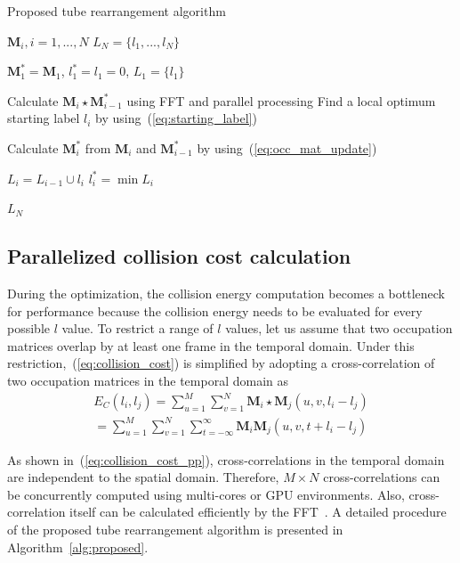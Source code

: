 \documentclass[11pt]{hyu_thesis}
\begin{document}
\begin{algorithm}[t]
\caption{Proposed tube rearrangement algorithm}
\label{alg:proposed}

\begin{algorithmic}
\REQUIRE $\textbf{M}_{i}, i = 1,...,N$
\ENSURE $L_{N} = \{ l_{1},...,l_{N} \}$

\STATE $\textbf{M}_{1}^{*} = \textbf{M}_{1}$, $l_{1}^{*} = l_{1} = 0$, $L_{1} = \{ l_{1} \}$

	\STATE Calculate $\textbf{M}_{i} \star \textbf{M}_{i-1}^{*}$ using FFT and parallel processing
	\STATE Find a local optimum starting label $l_{i}$ by using~(\ref{eq:starting_label})

	\STATE Calculate $\textbf{M}_{i}^{*}$ from $\textbf{M}_{i}$ and $\textbf{M}_{i-1}^{*}$ by using~(\ref{eq:occ_mat_update})

	\STATE $L_{i} = L_{i-1} \cup l_{i}$
	\STATE $l_{i}^{*} = \min L_{i}$
\ENDFOR

\RETURN $L_{N}$
\end{algorithmic}

\end{algorithm}

\subsection{Parallelized collision cost calculation}
During the optimization, the collision energy computation becomes a bottleneck for performance because the collision energy needs to be evaluated for every possible $l$ value. To restrict a range of $l$ values, let us assume that two occupation matrices overlap by at least one frame in the temporal domain. Under this restriction,~(\ref{eq:collision_cost}) is simplified by adopting a cross-correlation of two occupation matrices in the temporal domain as
\begin{equation}
\label{eq:collision_cost_pp}
\begin{aligned}
E_C(l_i, l_j) = \sum_{u=1}^{M} \sum_{v=1}^{N} \textbf{M}_{i} \star \textbf{M}_{j}(u, v, l_i - l_j)\\
= \sum_{u=1}^{M} \sum_{v=1}^{N} \sum_{t=-\infty}^{\infty} \textbf{M}_{i}\textbf{M}_{j}(u, v, t + l_i - l_j)
\end{aligned}
\end{equation}

As shown in~(\ref{eq:collision_cost_pp}), cross-correlations in the temporal domain are independent to the spatial domain. Therefore, $M \times N$ cross-correlations can be concurrently computed using multi-cores or GPU environments. Also, cross-correlation itself can be calculated efficiently by the FFT~\cite{Oppenheim2009}. A detailed procedure of the proposed tube rearrangement algorithm is presented in Algorithm~\ref{alg:proposed}.
\end{document}
